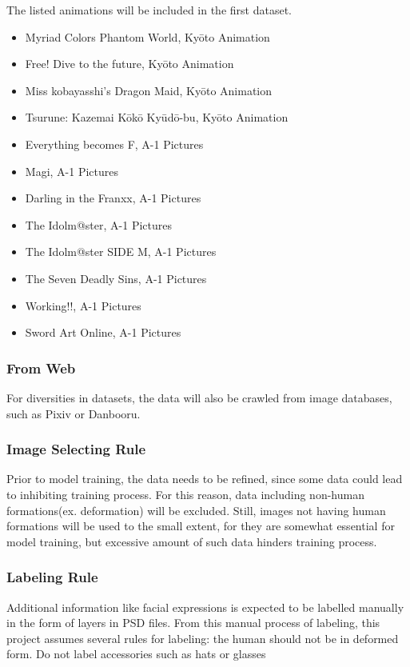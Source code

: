 \documentclass{article}
\begin{document}
The listed animations will be included in the first dataset.
\begin{itemize}
\item Myriad Colors Phantom World, Kyōto Animation
\item Free! Dive to the future, Kyōto Animation
\item Miss kobayasshi's Dragon Maid, Kyōto Animation
\item Tsurune: Kazemai Kōkō Kyūdō-bu, Kyōto Animation

\item Everything becomes F, A-1 Pictures
\item Magi, A-1 Pictures
\item Darling in the Franxx, A-1 Pictures
\item The Idolm@ster, A-1 Pictures
\item The Idolm@ster SIDE M, A-1 Pictures
\item The Seven Deadly Sins, A-1 Pictures
\item Working!!, A-1 Pictures
\item Sword Art Online, A-1 Pictures
\end{itemize}

\subsubsection{From Web}

For diversities in datasets, the data will also be crawled from image databases, such as Pixiv or Danbooru.

\subsubsection{Image Selecting Rule}

Prior to model training, the data needs to be refined, since some data could lead to inhibiting training process. For this reason, data including non-human formations(ex. deformation) will be excluded. Still, images not having human formations will be used to the small extent, for they are somewhat essential for model training, but excessive amount of such data hinders training process.

\subsubsection{Labeling Rule}
Additional information like facial expressions is expected to be labelled manually in the form of layers in PSD files. From this manual process of labeling, this project assumes several rules for labeling:
    the human should not be in deformed form.
    Do not label accessories such as hats or glasses \newline
\end{document}
